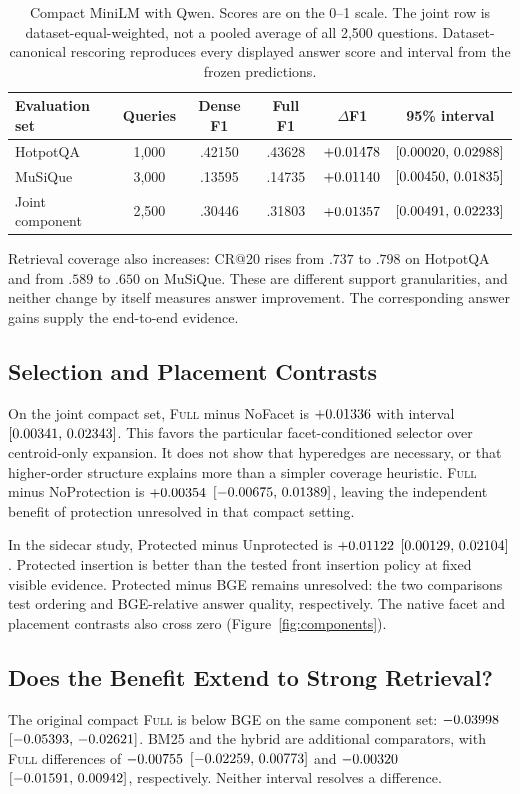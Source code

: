 \documentclass[11pt]{article}
\newcommand{\full}{\textsc{Full}\xspace}
\begin{document}
\begin{table}[t]
\centering\small
\begin{tabular}{@{}lccccc@{}}
\toprule
Evaluation set & Queries & Dense F1 & Full F1 & $\Delta$F1 & 95\% interval\\
\midrule
HotpotQA & 1,000 & .42150 & .43628 & $+0.01478$ & $[0.00020,\,0.02988]$\\
MuSiQue & 3,000 & .13595 & .14735 & $+0.01140$ & $[0.00450,\,0.01835]$\\
Joint component & 2,500 & .30446 & .31803 & $+0.01357$ & $[0.00491,\,0.02233]$\\
\bottomrule
\end{tabular}
\caption{Compact MiniLM with Qwen. Scores are on the 0--1 scale. The joint row
is dataset-equal-weighted, not a pooled average of all 2,500 questions.
Dataset-canonical rescoring reproduces every displayed answer score and
interval from the frozen predictions.}
\label{tab:compact}
\end{table}

Retrieval coverage also increases: CR@20 rises from $.737$ to $.798$ on
HotpotQA and from $.589$ to $.650$ on MuSiQue. These are different support
granularities, and neither change by itself measures answer improvement.
The corresponding answer gains supply the end-to-end evidence.

\subsection{Selection and Placement Contrasts}
On the joint compact set, \full minus NoFacet is $+0.01336$
with interval $[0.00341,\,0.02343]$. This favors the particular facet-conditioned
selector over centroid-only expansion. It does not show that hyperedges are
necessary, or that higher-order structure explains more than a simpler
coverage heuristic. \full minus NoProtection is $+0.00354$
$[-0.00675,\,0.01389]$, leaving the independent benefit of protection unresolved
in that compact setting.

In the sidecar study, Protected minus Unprotected is $+0.01122$
$[0.00129,\,0.02104]$. Protected insertion is better than the tested front
insertion policy at fixed visible evidence. Protected minus BGE remains
unresolved: the two comparisons test ordering and BGE-relative answer
quality, respectively.
The native facet and placement contrasts also cross zero
(Figure~\ref{fig:components}).

\subsection{Does the Benefit Extend to Strong Retrieval?}
The original compact \full is below BGE on the same component set:
$-0.03998$ $[-0.05393,\,-0.02621]$. BM25 and the hybrid are additional comparators,
with \full differences of $-0.00755$ $[-0.02259,\,0.00773]$ and
$-0.00320$ $[-0.01591,\,0.00942]$, respectively.
Neither interval resolves a difference.
\end{document}
